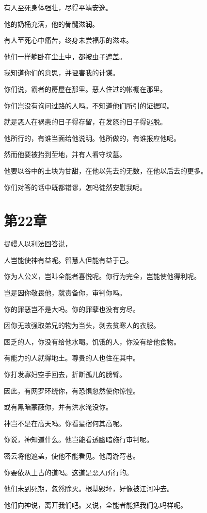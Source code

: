 \documentclass[12pt,oneside]{book}
\begin{document}
有人至死身体强壮，尽得平靖安逸。

他的奶桶充满，他的骨髓滋润。

有人至死心中痛苦，终身未尝福乐的滋味。

他们一样躺卧在尘土中，都被虫子遮盖。

我知道你们的意思，并诬害我的计谋。

你们说，霸者的房屋在那里。恶人住过的帐棚在那里。

你们岂没有询问过路的人吗。不知道他们所引的证据吗。

就是恶人在祸患的日子得存留，在发怒的日子得逃脱。

他所行的，有谁当面给他说明。他所做的，有谁报应他呢。

然而他要被抬到茔地，并有人看守坟墓。

他要以谷中的土块为甘甜，在他以先去的无数，在他以后去的更多。

你们对答的话中既都错谬，怎吗徒然安慰我呢。


\chapter{第22章}
提幔人以利法回答说，

人岂能使神有益呢。智慧人但能有益于己。

你为人公义，岂叫全能者喜悦呢。你行为完全，岂能使他得利呢。

岂是因你敬畏他，就责备你，审判你吗。

你的罪恶岂不是大吗。你的罪孽也没有穷尽。

因你无故强取弟兄的物为当头，剥去贫寒人的衣服。

困乏的人，你没有给他水喝。饥饿的人，你没有给他食物。

有能力的人就得地土。尊贵的人也住在其中。

你打发寡妇空手回去，折断孤儿的膀臂。

因此，有网罗环绕你，有恐惧忽然使你惊惶。

或有黑暗蒙蔽你，并有洪水淹没你。

神岂不是在高天吗。你看星宿何其高呢。

你说，神知道什么。他岂能看透幽暗施行审判呢。

密云将他遮盖，使他不能看见。他周游穹苍。

你要依从上古的道吗。这道是恶人所行的。

他们未到死期，忽然除灭。根基毁坏，好像被江河冲去。

他们向神说，离开我们吧。又说，全能者能把我们怎吗样呢。
\end{document}
